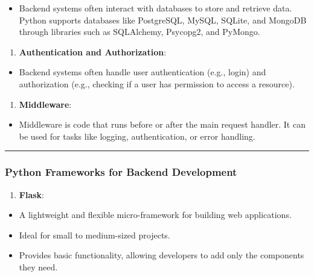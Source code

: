 \documentclass[11pt]{article}
\providecommand{\tightlist}{%
      \setlength{\itemsep}{0pt}\setlength{\parskip}{0pt}}
\begin{document}
\begin{itemize}
\tightlist
\item
  Backend systems often interact with databases to store and retrieve
  data. Python supports databases like PostgreSQL, MySQL, SQLite, and
  MongoDB through libraries such as SQLAlchemy, Psycopg2, and PyMongo.
\end{itemize}

\begin{enumerate}
\def\labelenumi{\arabic{enumi}.}
\setcounter{enumi}{6}
\tightlist
\item
  \textbf{Authentication and Authorization}:
\end{enumerate}

\begin{itemize}
\tightlist
\item
  Backend systems often handle user authentication (e.g., login) and
  authorization (e.g., checking if a user has permission to access a
  resource).
\end{itemize}

\begin{enumerate}
\def\labelenumi{\arabic{enumi}.}
\setcounter{enumi}{7}
\tightlist
\item
  \textbf{Middleware}:
\end{enumerate}

\begin{itemize}
\tightlist
\item
  Middleware is code that runs before or after the main request handler.
  It can be used for tasks like logging, authentication, or error
  handling.
\end{itemize}

\begin{center}\rule{0.5\linewidth}{\linethickness}\end{center}

\subsubsection{\texorpdfstring{\textbf{Python Frameworks for Backend
Development}}{Python Frameworks for Backend Development}}\label{python-frameworks-for-backend-development}

\begin{enumerate}
\def\labelenumi{\arabic{enumi}.}
\tightlist
\item
  \textbf{Flask}:
\end{enumerate}

\begin{itemize}
\tightlist
\item
  A lightweight and flexible micro-framework for building web
  applications.
\item
  Ideal for small to medium-sized projects.
\item
  Provides basic functionality, allowing developers to add only the
  components they need.
\end{itemize}
\end{document}
